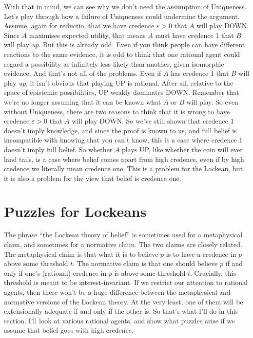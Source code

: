\documentclass[11pt,]{book}
\begin{document}
With that in mind, we can see why we don't need the assumption of Uniqueness. Let's play through how a failure of Uniqueness could undermine the argument. Assume, again for reductio, that we have credence \(\varepsilon > 0\) that \(A\) will play DOWN. Since \(A\) maximises expected utility, that means \(A\) must have credence 1 that \(B\) will play \emph{up}. But this is already odd. Even if you think people can have different reactions to the same evidence, it is odd to think that one rational agent could regard a possibility as infinitely less likely than another, given isomorphic evidence. And that's not all of the problems. Even if \(A\) has credence 1 that \(B\) will play \emph{up}, it isn't obvious that playing UP is rational. After all, relative to the space of epistemic possibilities, UP weakly dominates DOWN. Remember that we're no longer assuming that it can be known what \(A\) or \(B\) will play. So even without Uniqueness, there are two reasons to think that it is wrong to have credence \(\varepsilon > 0\) that \(A\) will play DOWN. So we've still shown that credence 1 doesn't imply knowledge, and since the proof is known to us, and full belief is incompatible with knowing that you can't know, this is a case where credence 1 doesn't imply full belief. So whether \(A\) plays UP, like whether the coin will ever land tails, is a case where belief comes apart from high credence, even if by high credence we literally mean credence one. This is a problem for the Lockean, but it is also a problem for the view that belief is credence one.

\hypertarget{puzzles-for-lockeans}{%
\section{Puzzles for Lockeans}\label{puzzles-for-lockeans}}

The phrase ``the Lockean theory of belief'' is sometimes used for a metaphysical claim, and sometimes for a normative claim. The two claims are closely related. The metaphysical claim is that what it is to believe \(p\) is to have a credence in \(p\) above some threshold \(t\). The normative claim is that one should believe \(p\) if and only if one's (rational) credence in \(p\) is above some threshold \(t\). Crucially, this threshold is meant to be interest-invariant. If we restrict our attention to rational agents, then there won't be a huge difference between the metaphysical and normative versions of the Lockean theory. At the very least, one of them will be extensionally adequate if and only if the other is. So that's what I'll do in this section. I'll look at various rational agents, and show what puzzles arise if we assume that belief goes with high credence.
\end{document}
